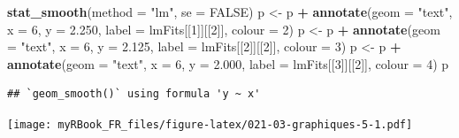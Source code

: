 \documentclass[
]{book}
\newenvironment{Shaded}{\begin{snugshade}}{\end{snugshade}}
\newcommand{\DataTypeTok}[1]{\textcolor[rgb]{0.13,0.29,0.53}{#1}}
\newcommand{\DecValTok}[1]{\textcolor[rgb]{0.00,0.00,0.81}{#1}}
\newcommand{\FloatTok}[1]{\textcolor[rgb]{0.00,0.00,0.81}{#1}}
\newcommand{\KeywordTok}[1]{\textcolor[rgb]{0.13,0.29,0.53}{\textbf{#1}}}
\newcommand{\NormalTok}[1]{#1}
\newcommand{\OperatorTok}[1]{\textcolor[rgb]{0.81,0.36,0.00}{\textbf{#1}}}
\newcommand{\OtherTok}[1]{\textcolor[rgb]{0.56,0.35,0.01}{#1}}
\newcommand{\StringTok}[1]{\textcolor[rgb]{0.31,0.60,0.02}{#1}}
\begin{document}
\begin{Shaded}
\begin{Highlighting}[]
\StringTok{  }\KeywordTok{stat_smooth}\NormalTok{(}\DataTypeTok{method =} \StringTok{"lm"}\NormalTok{, }\DataTypeTok{se =} \OtherTok{FALSE}\NormalTok{)}
\NormalTok{p <-}\StringTok{ }\NormalTok{p }\OperatorTok{+}\StringTok{ }\KeywordTok{annotate}\NormalTok{(}\DataTypeTok{geom =} \StringTok{"text"}\NormalTok{, }\DataTypeTok{x =} \DecValTok{6}\NormalTok{, }\DataTypeTok{y =} \FloatTok{2.250}\NormalTok{, }
  \DataTypeTok{label =}\NormalTok{ lmFits[[}\DecValTok{1}\NormalTok{]][[}\DecValTok{2}\NormalTok{]], }\DataTypeTok{colour =} \DecValTok{2}\NormalTok{)}
\NormalTok{p <-}\StringTok{ }\NormalTok{p }\OperatorTok{+}\StringTok{ }\KeywordTok{annotate}\NormalTok{(}\DataTypeTok{geom =} \StringTok{"text"}\NormalTok{, }\DataTypeTok{x =} \DecValTok{6}\NormalTok{, }\DataTypeTok{y =} \FloatTok{2.125}\NormalTok{, }
  \DataTypeTok{label =}\NormalTok{ lmFits[[}\DecValTok{2}\NormalTok{]][[}\DecValTok{2}\NormalTok{]], }\DataTypeTok{colour =} \DecValTok{3}\NormalTok{)}
\NormalTok{p <-}\StringTok{ }\NormalTok{p }\OperatorTok{+}\StringTok{ }\KeywordTok{annotate}\NormalTok{(}\DataTypeTok{geom =} \StringTok{"text"}\NormalTok{, }\DataTypeTok{x =} \DecValTok{6}\NormalTok{, }\DataTypeTok{y =} \FloatTok{2.000}\NormalTok{, }
  \DataTypeTok{label =}\NormalTok{ lmFits[[}\DecValTok{3}\NormalTok{]][[}\DecValTok{2}\NormalTok{]], }\DataTypeTok{colour =} \DecValTok{4}\NormalTok{)}
\NormalTok{p}
\end{Highlighting}
\end{Shaded}

\begin{verbatim}
## `geom_smooth()` using formula 'y ~ x'
\end{verbatim}

\texttt{[image: myRBook\_FR\_files/figure-latex/021-03-graphiques-5-1.pdf]}
\end{document}
